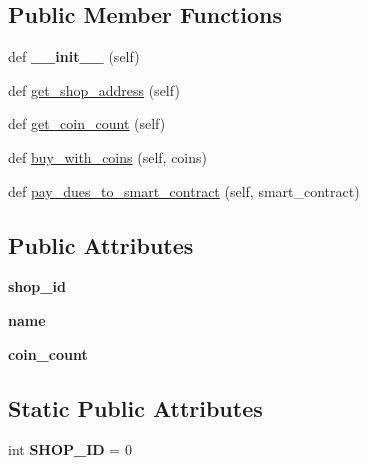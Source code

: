 \subsection*{Public Member Functions}
\begin{DoxyCompactItemize}
\item 
\mbox{\label{class_shop_1_1_shop_a307a03fe53eb1c546fdd731386ec85ad}} 
def {\bfseries \+\_\+\+\_\+init\+\_\+\+\_\+} (self)
\item 
def \mbox{\hyperlink{class_shop_1_1_shop_a2fc55120d0b88ac30018a14a98632e43}{get\+\_\+shop\+\_\+address}} (self)
\item 
def \mbox{\hyperlink{class_shop_1_1_shop_aa57249095c0d73dcc3bf6223ec15c0ad}{get\+\_\+coin\+\_\+count}} (self)
\item 
def \mbox{\hyperlink{class_shop_1_1_shop_af62739edeb16dfc57c23c5a4ff1a54e9}{buy\+\_\+with\+\_\+coins}} (self, coins)
\item 
def \mbox{\hyperlink{class_shop_1_1_shop_a34e743286fb3f62aef7cf8f9ec242e03}{pay\+\_\+dues\+\_\+to\+\_\+smart\+\_\+contract}} (self, smart\+\_\+contract)
\end{DoxyCompactItemize}
\subsection*{Public Attributes}
\begin{DoxyCompactItemize}
\item 
\mbox{\label{class_shop_1_1_shop_aad32dbba8d9f9b0fef32185b90457f18}} 
{\bfseries shop\+\_\+id}
\item 
\mbox{\label{class_shop_1_1_shop_ad50dfb8118821dc93843241195cdc990}} 
{\bfseries name}
\item 
\mbox{\label{class_shop_1_1_shop_ab4c935094df2a25f6f7bad4634532db7}} 
{\bfseries coin\+\_\+count}
\end{DoxyCompactItemize}
\subsection*{Static Public Attributes}
\begin{DoxyCompactItemize}
\item 
\mbox{\label{class_shop_1_1_shop_ad0e4a35831e14af289f21c81d1a56261}} 
int {\bfseries S\+H\+O\+P\+\_\+\+ID} = 0
\end{DoxyCompactItemize}


